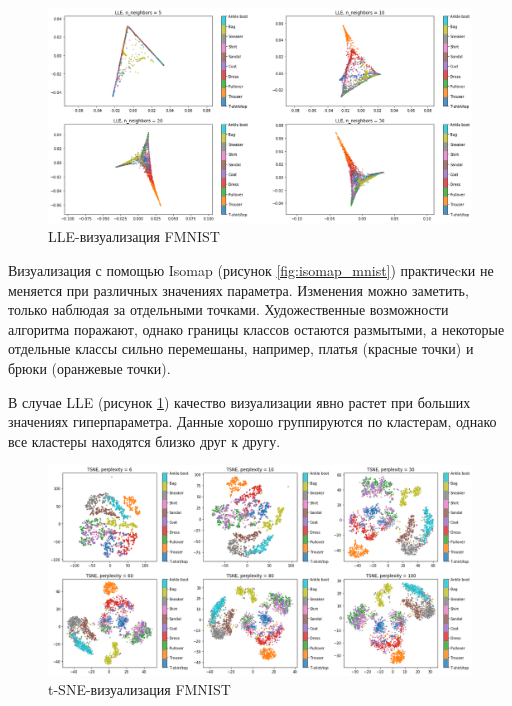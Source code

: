 \documentclass[10pt, a4paper]{extarticle}
\begin{document}
\begin{figure}[htp!]
    \centering
    \includegraphics[width=\linewidth]{lle_mnist.png}
    \caption{LLE-визуализация FMNIST}
    \label{fig:lle_mnist}
\end{figure}

Визуализация с помощью Isomap (рисунок \ref{fig:isomap_mnist}) практичеcки не меняется при различных значениях параметра.
Изменения можно заметить, только наблюдая за отдельными точками.
Художественные возможности алгоритма поражают, однако границы классов остаются размытыми, а некоторые отдельные классы сильно перемешаны, например, платья (красные точки) и брюки (оранжевые точки).

В случае LLE (рисунок \ref{fig:lle_mnist}) качество визуализации явно растет при больших значениях гиперпараметра.
Данные хорошо группируются по кластерам, однако все кластеры находятся близко друг к другу.

\begin{figure}[t!]
    \vspace{1em}
    \centering
    \includegraphics[width=\linewidth]{tsne_mnist.png}
    \caption{t-SNE-визуализация FMNIST}
    \label{fig:tsne_mnist}
\end{figure}
\end{document}
